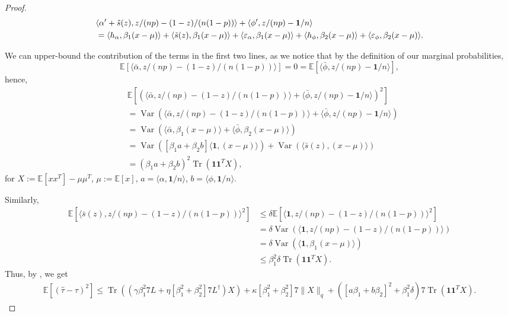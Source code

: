 \documentclass[12pt]{article}
\theoremstyle{definition}
\numberwithin{equation}{section}
\numberwithin{figure}{section}
\numberwithin{equation}{section}
\numberwithin{figure}{section}
\begin{document}
\begin{proof}
     \begin{align*}
         &\langle \alpha' + \Tilde{s}(z), z/(np) - (1-z)/(n(1-p))\rangle + \langle \phi',z/(np) - \mathbf{1}/n\rangle \\
         &= \langle h_\alpha, \beta_1 (x - \mu)\rangle + \langle \Tilde{s}(z), \beta_1 (x - \mu)\rangle + \langle \varepsilon_\alpha, \beta_1 (x - \mu)\rangle + \langle h_\phi, \beta_2 (x - \mu) \rangle + \langle \varepsilon_\phi, \beta_2 (x - \mu)\rangle.
     \end{align*}

     We can upper-bound the contribution of the terms in the first two lines, as we notice that by the definition of our marginal probabilities,
     \[\mathbb{E}[
      \langle \bar{\alpha}, z/(np) - (1-z)/(n(1-p))\rangle] = 0 = \mathbb{E}[\langle \bar{\phi},z/(np) - \mathbf{1}/n\rangle],
     \]
    hence,
     \begin{align*}
         &\mathbb{E}[(\langle \bar{\alpha}, z/(np) - (1-z)/(n(1-p))  \rangle + \langle \bar{\phi}, z/(np) - \mathbf{1}/n \rangle)^2] \\
         &= \operatorname{Var}(\langle \bar{\alpha}, z/(np) - (1-z)/(n(1-p))\rangle + \langle \bar{\phi}, z/(np) - \mathbf{1}/n \rangle )\\
         &= \operatorname{Var}(\langle \bar{\alpha}, \beta_1 (x-\mu) \rangle + \langle \bar{\phi}, \beta_2 (x-\mu) \rangle)\\
         &= \operatorname{Var}([\beta_1a + \beta_2 b]\langle \mathbf{1},  (x-\mu)  \rangle) + \operatorname{Var}(\langle \bar{s}(z),  (x-\mu)  \rangle)\\
         &= (\beta_1 a + \beta_2 b)^2 \operatorname{Tr}(\mathbf{1}\mathbf{1}^TX),
     \end{align*}
     for $X:=\mathbb{E}[xx^T] - \mu \mu^T$, $\mu := \mathbb{E}[x]$, $a = \langle \alpha, \mathbf{1}/n\rangle$, $b = \langle \phi, \mathbf{1}/n\rangle$. 

    Similarly, 
         \begin{align*}
         \mathbb{E}[\langle \bar{s}(z), z/(np) - (1-z)/(n(1-p)) \rangle^2] &\leq \delta \mathbb{E}[\langle \mathbf{1}, z/(np) - (1-z)/(n(1-p))  \rangle^2]\\
         &= \delta \operatorname{Var}(\langle \mathbf{1}, z/(np) - (1-z)/(n(1-p))\rangle) \\
         &= \delta \operatorname{Var}(\langle \mathbf{1}, \beta_1 (x-\mu) \rangle)\\
         &\leq \beta_1^2 \delta \operatorname{Tr}(\mathbf{1}\mathbf{1}^TX).
     \end{align*}
     Thus, by , we get
     \begin{align*}
         \mathbb{E}[(\hat{\tau} - \tau )^2] \leq \operatorname{Tr}((\gamma \beta_1^2 7 L + \eta[\beta_1^2 + \beta_2^2]7L^\dagger) X) + \kappa[\beta_1^2 + \beta_2^2]7 \|X\|_{q} + ([a\beta_1 + b\beta_2]^2 + \beta_1^2 \delta) 7 \operatorname{Tr}(\mathbf{1}\mathbf{1}^TX).
     \end{align*}    
\end{proof}
\end{document}
